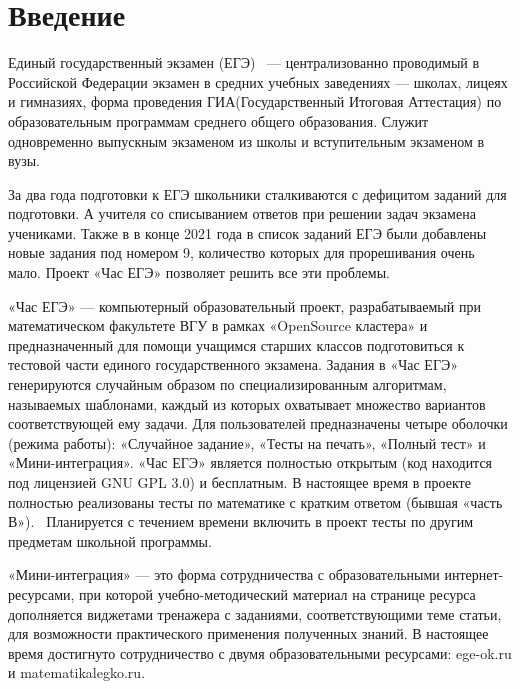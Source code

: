 
\section*{Введение}
Единый государственный экзамен (ЕГЭ)~\cite{ege} --- централизованно проводимый в Российской 
Федерации экзамен в средних учебных заведениях — школах, лицеях и гимназиях,
форма проведения ГИА(Государственный Итоговая Аттестация) по образовательным программам среднего общего образования.
Служит одновременно выпускным экзаменом из школы и вступительным экзаменом в вузы.

За два года подготовки к ЕГЭ школьники сталкиваются с дефицитом заданий для подготовки.
А учителя со списыванием ответов при решении задач экзамена учениками. 
Также в в конце 2021 года в список заданий ЕГЭ были добавлены новые задания под номером 9, 
количество которых для прорешивания очень мало. 
Проект «Час ЕГЭ» позволяет решить все эти проблемы.

«Час ЕГЭ» — компьютерный образовательный проект, разрабатываемый при математическом 
факультете ВГУ в рамках «OpenSource кластера» и предназначенный для помощи учащимся 
старших классов подготовиться к тестовой части единого государственного экзамена.
Задания в «Час ЕГЭ» генерируются случайным образом по специализированным алгоритмам, 
называемых шаблонами, каждый из которых
 охватывает множество вариантов соответствующей ему задачи. Для 
пользователей 
предназначены четыре оболочки (режима работы): «Случайное задание», «Тесты на печать», 
«Полный тест» и «Мини-интеграция».
«Час ЕГЭ» является полностью открытым (код находится под лицензией GNU GPL 3.0) 
и бесплатным.
В настоящее время в проекте полностью реализованы тесты по математике с кратким 
ответом (бывшая «часть В»).~\cite{fipi}
Планируется с течением времени включить в проект тесты по другим предметам школьной 
программы.

«Мини-интеграция» — это форма сотрудничества с образовательными интернет-ресурсами, 
при которой учебно-методический материал на странице ресурса дополняется виджетами 
тренажера с заданиями, соответствующими теме статьи, для возможности практического 
применения полученных знаний.
В настоящее время достигнуто сотрудничество с двумя образовательными ресурсами: ege-ok.ru 
и matematikalegko.ru.
